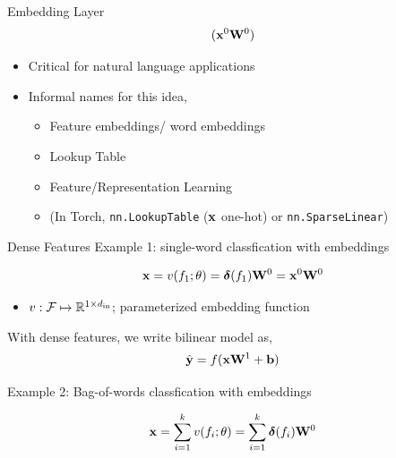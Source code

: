 \documentclass{beamer}
\begin{document}
\begin{frame}{Embedding Layer}
  \[ (\mathbf{x}^0 \mathbf{W}^0)\]
  \begin{center}

  \end{center}
  \begin{itemize}
  \item Critical for natural language applications
  \item Informal names for this idea,
    \begin{itemize}
    \item Feature embeddings/ word embeddings
    \item Lookup Table
    \item Feature/Representation Learning
    \item (In Torch, \texttt{nn.LookupTable} ($\mathbf{x}$ one-hot) or \texttt{nn.SparseLinear})
    \end{itemize}
  \end{itemize}
\end{frame}

\begin{frame}{Dense Features}
  Example 1: single-word classfication with embeddings

  \[ \mathbf{x} = v(f_1; \theta) = \boldsymbol{\delta}(f_1) \mathbf{W}^0 = \mathbf{x}^0 \mathbf{W}^0\]

  \begin{itemize}
  \item $v: \mathcal{F} \mapsto \mathbb{R}^{1\times {d_{\mathrm{in}}}}$; parameterized embedding function
  \end{itemize}

  With dense features, we write bilinear model as,
  \[\hat{\mathbf{y}} = f(\mathbf{x}\mathbf{W}^1 + \mathbf{b})\]

  Example 2: Bag-of-words classfication with embeddings

  \[ \mathbf{x} = \sum_{i=1}^{k} v(f_i; \theta) = \sum_{i=1}^{k} \boldsymbol{\delta}(f_i) \mathbf{W}^0\]
\end{frame}
\end{document}
